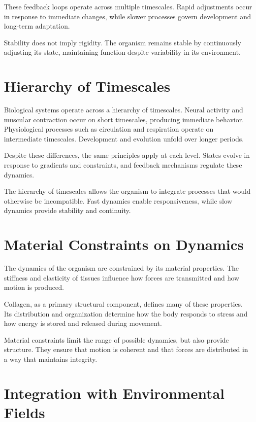 \documentclass[11pt,oneside]{book}
\begin{document}
These feedback loops operate across multiple timescales. Rapid adjustments occur in response to immediate changes, while slower processes govern development and long-term adaptation.

Stability does not imply rigidity. The organism remains stable by continuously adjusting its state, maintaining function despite variability in its environment.

\section{Hierarchy of Timescales}

Biological systems operate across a hierarchy of timescales. Neural activity and muscular contraction occur on short timescales, producing immediate behavior. Physiological processes such as circulation and respiration operate on intermediate timescales. Development and evolution unfold over longer periods.

Despite these differences, the same principles apply at each level. States evolve in response to gradients and constraints, and feedback mechanisms regulate these dynamics.

The hierarchy of timescales allows the organism to integrate processes that would otherwise be incompatible. Fast dynamics enable responsiveness, while slow dynamics provide stability and continuity.

\section{Material Constraints on Dynamics}

The dynamics of the organism are constrained by its material properties. The stiffness and elasticity of tissues influence how forces are transmitted and how motion is produced.

Collagen, as a primary structural component, defines many of these properties. Its distribution and organization determine how the body responds to stress and how energy is stored and released during movement.

Material constraints limit the range of possible dynamics, but also provide structure. They ensure that motion is coherent and that forces are distributed in a way that maintains integrity.

\section{Integration with Environmental Fields}
\end{document}
